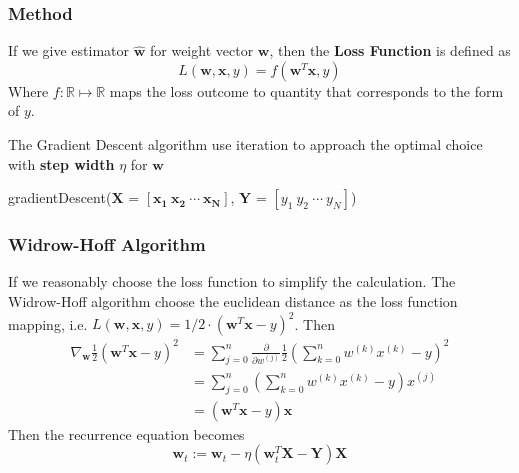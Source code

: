 \documentclass[12pt]{article}
\begin{document}
\subsubsection{Method}
If we give estimator $ \bm{\hat w}$ for weight vector $\bm{w}$, then the \textbf{Loss Function} is defined as
\begin{equation}
    L(\bm{w}, \bm{x}, y) = f(\bm{w}^T \bm{x}, y)
\end{equation}
Where $f:\mathbb{R} \mapsto \mathbb{R}$ maps the loss outcome to quantity that corresponds to the form of $y$. \par
The Gradient Descent algorithm use iteration to approach the optimal choice with \textbf{step width} $\eta$ for $\bm{w}$
\begin{algorithm}[H]
    \caption{gradientDescent($\bm{X}$ = $[\bm{x_1}~\bm{x_2}~\cdots~\bm{x_N}]$, $\bm{Y}$ = $[y_1~y_2~\cdots~y_N]$)}
    \label{GD}
    \begin{algorithmic}
        \ENDFOR
    \end{algorithmic}
\end{algorithm}
\subsubsection{Widrow-Hoff Algorithm}
If we reasonably choose the loss function to simplify the calculation. The Widrow-Hoff algorithm choose the euclidean distance as the loss function mapping, i.e. $L(\bm{w}, \bm{x}, y) = 1/2 \cdot (\bm{w}^T\bm{x} - y)^2$. Then
\begin{equation}
\begin{aligned}
    \nabla_{\bm{w}} \frac{1}{2}(\bm{w}^T\bm{x} - y)^2  &= \sum_{j=0}^n \frac{\partial}{\partial w^{(j)}}\frac{1}{2}\left( \sum_{k=0}^n w^{(k)}x^{(k)} - y\right)^2 \\
    &= \sum_{j=0}^n \left(\sum_{k=0}^n w^{(k)}x^{(k)} - y \right)x^{(j)} \\
    &= (\bm{w}^T \bm{x} - y)\bm{x}
\end{aligned}
\end{equation}
Then the recurrence equation becomes
\begin{equation}
    \bm{w}_t := \bm{w}_t - \eta(\bm{w}_t^T \bm{X} - \bm{Y})\bm{X}
\end{equation}
\end{document}
